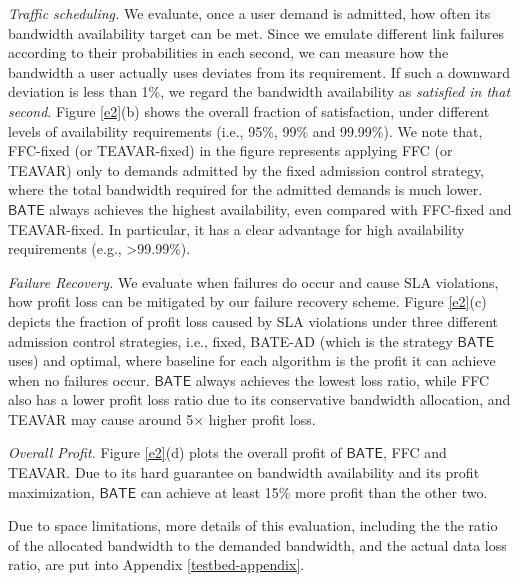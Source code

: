 \documentclass[sigconf]{acmart}
\begin{document}
\textit{Traffic scheduling.} We evaluate, once a user demand is admitted, 
how often its bandwidth availability target can be met. 
Since we emulate different link failures according to their probabilities in each second, 
we can measure how the bandwidth a user actually uses deviates from its requirement. 
If such a downward deviation is less than 1\%, we regard the bandwidth availability as \textit{satisfied in that second}. Figure \ref{e2}(b) shows the overall fraction of satisfaction, under  different levels of availability requirements (i.e., 95\%, 99\% and 99.99\%). 
We note that, FFC-fixed (or TEAVAR-fixed) in the figure represents applying FFC (or TEAVAR) 
only to demands admitted by the fixed admission control strategy, 
where the total bandwidth required for the admitted demands is much lower. 
$\mathsf{BATE}$ always achieves the highest availability, even compared with FFC-fixed and TEAVAR-fixed. 
In particular, it has a clear advantage for high availability requirements (e.g., >99.99\%). 


\textit{Failure Recovery.} We evaluate when failures do occur and cause SLA violations, 
how profit loss can be mitigated by our failure recovery scheme.
Figure \ref{e2}(c) depicts the fraction of profit loss caused by SLA violations under three different admission control strategies, i.e., fixed, BATE-AD (which is the strategy $\mathsf{BATE}$ uses) and optimal, where baseline for each algorithm is the profit it can achieve when no failures occur. 
$\mathsf{BATE}$ always achieves the lowest loss ratio, while 
FFC also has a lower profit loss ratio due to its conservative bandwidth allocation,
and TEAVAR may cause around 5$\times$ higher profit loss.

\textit{Overall Profit.}
Figure \ref{e2}(d) plots the overall profit of $\mathsf{BATE}$, FFC and TEAVAR.
Due to its hard guarantee on bandwidth availability and its  profit maximization, 
$\mathsf{BATE}$ can achieve at least 15\% more profit than the other two.

Due to space limitations, more details of this evaluation, including the the ratio of the
allocated bandwidth to the demanded bandwidth, and the actual data loss ratio, 
are put into  Appendix \ref{testbed-appendix}.
\end{document}
